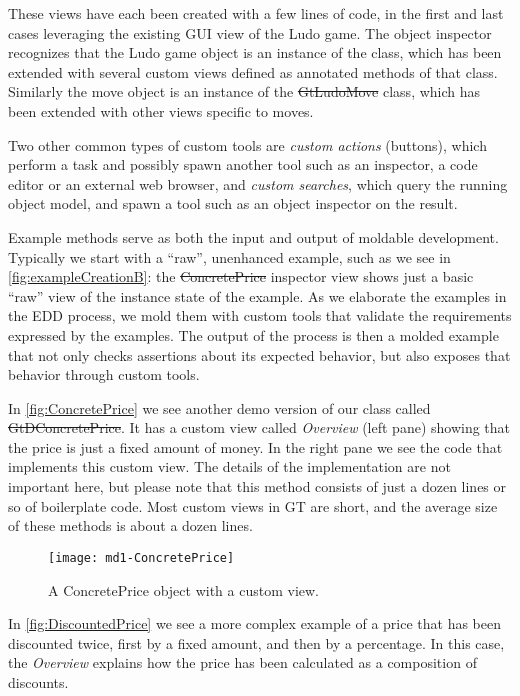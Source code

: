 \documentclass[acmsmall,screen,authorversion,nonacm]{acmart} %
\begin{document}
These views have each been created with a few lines of code, in the first and last cases leveraging the existing GUI view of the Ludo game.
The object inspector recognizes that the Ludo game object is an instance of the  class, 
which has been extended with several custom views defined as annotated methods of that class.
Similarly the move object is an instance of the \st{GtLudoMove} class, which has been extended with other views specific to moves.

Two other common types of custom tools are \emph{custom actions} (\eg buttons), which perform a task and possibly spawn another tool such as an inspector, a code editor or an external web browser, and \emph{custom searches}, which query the running object model, and spawn a tool such as an object inspector on the result.

Example methods serve as both the input and output of moldable development.
Typically we start with a ``raw'', unenhanced example, such as we see in \autoref{fig:exampleCreationB}: the \st{ConcretePrice} inspector view shows just a basic ``raw'' view of the instance state of the example.
As we elaborate the examples in the EDD process, we mold them with custom tools that validate the requirements expressed by the examples.
The output of the process is then a molded example that not only checks assertions about its expected behavior, but also exposes that behavior through custom tools.

In \autoref{fig:ConcretePrice} we see another demo version of our  class called \st{GtDConcretePrice}.
It has a custom view called \emph{Overview} (left pane) showing that the price is just a fixed amount of money.
In the right pane we see the code that implements this custom view.
The details of the implementation are not important here, but please note that this method consists of just a dozen lines or so of boilerplate code.
Most custom views in GT are short, and the average size of these methods is about a dozen lines.

\begin{figure}[h]
  \texttt{[image: md1-ConcretePrice]}
  \caption{A ConcretePrice object with a custom view.}
  \label{fig:ConcretePrice}
\end{figure}

In \autoref{fig:DiscountedPrice} we see a more complex example of a price that has been discounted twice, first by a fixed amount, and then by a percentage.
In this case, the \emph{Overview} explains how the price has been calculated as a composition of discounts.
\end{document}
